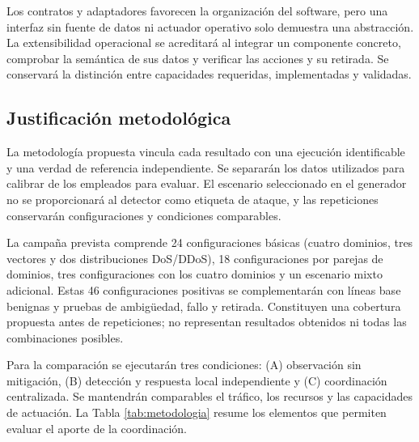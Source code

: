Los contratos y adaptadores favorecen la organización del software, pero una interfaz sin fuente de datos ni actuador operativo solo demuestra una abstracción. La extensibilidad operacional se acreditará al integrar un componente concreto, comprobar la semántica de sus datos y verificar las acciones y su retirada. Se conservará la distinción entre capacidades requeridas, implementadas y validadas.

\subsection{Justificación metodológica}

La metodología propuesta vincula cada resultado con una ejecución identificable y una verdad de referencia independiente. Se separarán los datos utilizados para calibrar de los empleados para evaluar. El escenario seleccionado en el generador no se proporcionará al detector como etiqueta de ataque, y las repeticiones conservarán configuraciones y condiciones comparables.

La campaña prevista comprende 24 configuraciones básicas (cuatro dominios, tres vectores y dos distribuciones DoS/DDoS), 18 configuraciones por parejas de dominios, tres configuraciones con los cuatro dominios y un escenario mixto adicional. Estas 46 configuraciones positivas se complementarán con líneas base benignas y pruebas de ambigüedad, fallo y retirada. Constituyen una cobertura propuesta antes de repeticiones; no representan resultados obtenidos ni todas las combinaciones posibles.

Para la comparación se ejecutarán tres condiciones: (A) observación sin mitigación, (B) detección y respuesta local independiente y (C) coordinación centralizada. Se mantendrán comparables el tráfico, los recursos y las capacidades de actuación. La Tabla \ref{tab:metodologia} resume los elementos que permiten evaluar el aporte de la coordinación.

